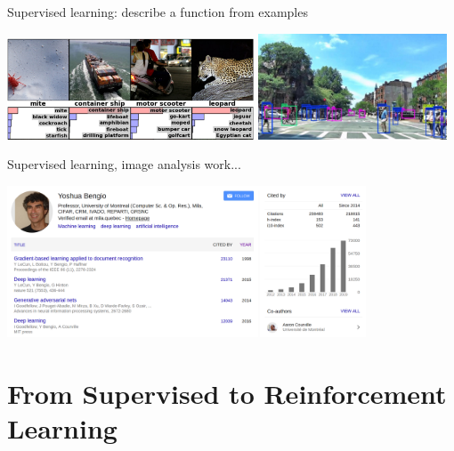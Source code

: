 \documentclass{beamer}
\begin{document}
\begin{frame}{Supervised learning: describe a function from examples}

    \begin{center}
      \includegraphics[width=0.55\textwidth]{./Figures/ANNs_supervised_learning/classification}
      \hspace{0.1cm}
      \includegraphics[width=0.42\textwidth]{./Figures/ANNs_supervised_learning/Neurala_AutoRecognition-08}
    \end{center}

    \begin{center}
    Supervised learning, image analysis work...
    \end{center}

    \begin{center}
      \includegraphics[width=0.8\textwidth]{./Figures/ANNs_supervised_learning/yoshua_bengio}
    \end{center}

\end{frame}













\section{From Supervised to Reinforcement Learning}
\end{document}
